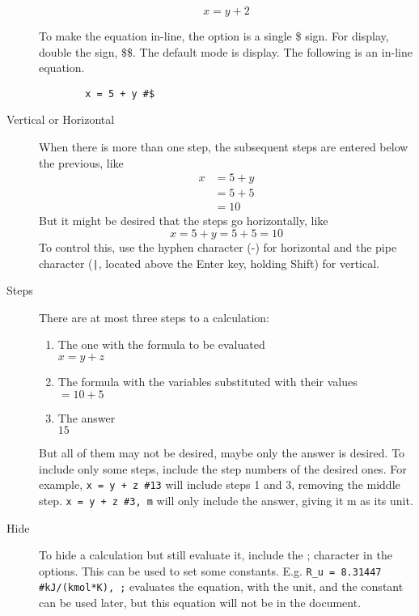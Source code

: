 \documentclass[12pt]{article}
\begin{document}
\begin{description}
        \[
            x = y + 2
        \]

        To make the equation in-line, the option is a single \$ sign. For
        display, double the sign, \$\$. The default mode is display. The
        following is an in-line equation.

        \begin{verbatim}
        x = 5 + y #$
        \end{verbatim}

    \item[Vertical or Horizontal] When there is more than one step, the
        subsequent steps are entered below the previous, like
        \[
            \begin{aligned}
                x &= 5 + y\\
                  &= 5 + 5\\
                  &= 10
            \end{aligned}
        \]
    But it might be desired that the steps go horizontally, like
    \[
        x = 5+y = 5+5 = 10
    \]
    To control this, use the hyphen character (-) for horizontal and the pipe
    character (\verb+|+, located above the Enter key, holding Shift) for
    vertical.

    \item[Steps] There are at most three steps to a calculation:
        \begin{enumerate}
            \setlength\itemsep{0pt}
            \item The one with the formula to be evaluated\\ $x = y + z$
            \item The formula with the variables substituted with their
                values\\ $=10+5$
            \item The answer\\ $15$
        \end{enumerate}

        But all of them may not be desired, maybe only the answer is desired.
        To include only some steps, include the step numbers of the desired
        ones. For example, \verb|x = y + z #13| will include steps 1 and 3,
        removing the middle step. \verb|x = y + z #3, m| will only include the
        answer, giving it m as its unit.

    \item[Hide] To hide a calculation but still evaluate it, include the ;
        character in the options. This can be used to set some constants. E.g.
        \verb|R_u = 8.31447 #kJ/(kmol*K), ;| evaluates the equation, with the
        unit, and the constant can be used later, but this equation will not be
        in the document.

\end{description}
\end{document}
